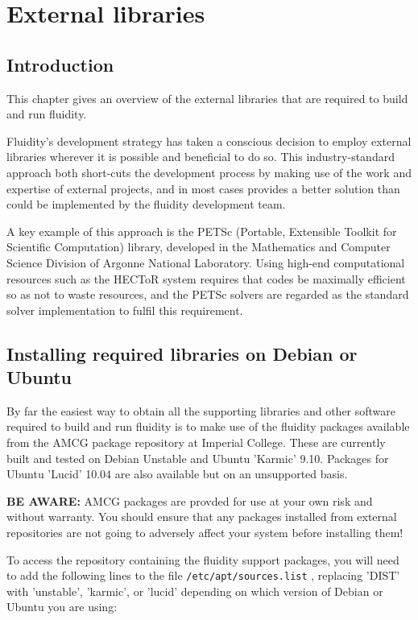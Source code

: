\chapter{External libraries}\label{chap:external}

\section{Introduction}
This chapter gives an overview of the external libraries that are required to
build and run fluidity.

Fluidity's development strategy has taken a conscious decision to employ
external libraries wherever it is possible and beneficial to do so. This
industry-standard approach both short-cuts the development process by making
use of the work and expertise of external projects, and in most cases provides
a better solution than could be implemented by the fluidity development team.

A key example of this approach is the PETSc (Portable, Extensible Toolkit for
Scientific Computation) library, developed in the Mathematics and Computer
Science Division of Argonne National Laboratory. Using high-end computational
resources such as the HECToR system requires that codes be maximally efficient
so as not to waste resources, and the PETSc solvers are regarded as the
standard solver implementation to fulfil this requirement.

\section{Installing required libraries on Debian or Ubuntu}
\label{sect:required_ḻibraries_debian}

By far the easiest way to obtain all the supporting libraries and other
software required to build and run fluidity is to make use of the fluidity
packages available from the AMCG package repository at Imperial College. These
are currently built and tested on Debian Unstable and Ubuntu 'Karmic' 9.10.
Packages for Ubuntu 'Lucid' 10.04 are also available but on an unsupported
basis.

\textbf{BE AWARE:} AMCG packages are provded for use at your own risk and
without warranty. You should ensure that any packages installed from external
repositories are not going to adversely affect your system before installing
them!

To access the repository containing the fluidity support packages, you will
need to add the following lines to the file
\lstinline[language=bash]+/etc/apt/sources.list+ , replacing 'DIST' with
'unstable', 'karmic', or 'lucid' depending on which version of Debian or Ubuntu
you are using:

